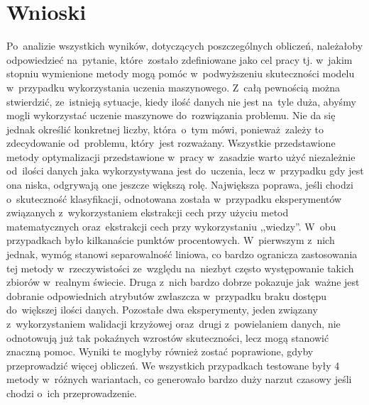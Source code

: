 
\section{Wnioski}\label{conclusion}
Po~analizie wszystkich wyników, dotyczących poszczególnych obliczeń, należałoby odpowiedzieć na~pytanie, które~zostało zdefiniowane jako cel pracy tj. w~jakim stopniu wymienione metody mogą pomóc w~podwyższeniu skuteczności modelu w~przypadku wykorzystania uczenia maszynowego. Z~całą pewnością można stwierdzić, ze~istnieją  sytuacje, kiedy ilość danych nie jest na~tyle duża, abyśmy mogli wykorzystać uczenie maszynowe do~rozwiązania problemu. Nie da się jednak określić konkretnej liczby, która~o~tym mówi, ponieważ~zależy to zdecydowanie od~problemu, który~jest rozważany. Wszystkie przedstawione metody optymalizacji przedstawione w~pracy w~zasadzie warto użyć niezależnie od~ilości danych jaka wykorzystywana jest do~uczenia, lecz w~przypadku gdy jest ona niska, odgrywają one jeszcze większą rolę. Największa poprawa, jeśli chodzi o~skuteczność klasyfikacji, odnotowana została w~przypadku eksperymentów związanych z~wykorzystaniem ekstrakcji cech przy użyciu metod matematycznych oraz~ekstrakcji cech przy wykorzystaniu ,,wiedzy''. W~obu przypadkach było kilkanaście punktów procentowych. W~pierwszym z~nich jednak, wymóg stanowi separowalność liniowa, co bardzo ogranicza zastosowania tej metody w~rzeczywistości ze~względu na~niezbyt często występowanie takich zbiorów w~realnym świecie. Druga z~nich bardzo dobrze pokazuje jak~ważne jest dobranie odpowiednich atrybutów zwłaszcza w~przypadku braku dostępu do~większej ilości danych. Pozostałe dwa eksperymenty, jeden związany z~wykorzystaniem walidacji krzyżowej oraz~drugi z~powielaniem danych, nie odnotowują już tak pokaźnych wzrostów skuteczności, lecz mogą stanowić znaczną pomoc. Wyniki te mogłyby również zostać poprawione, gdyby przeprowadzić więcej obliczeń. We wszystkich przypadkach testowane były 4 metody w~różnych wariantach, co generowało bardzo duży narzut czasowy jeśli chodzi o~ich przeprowadzenie.

